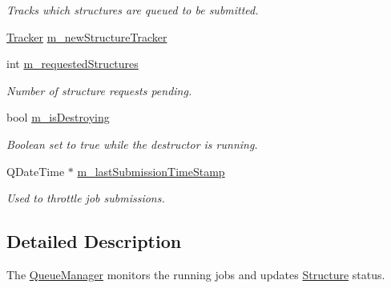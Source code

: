 \begin{DoxyCompactItemize}
\begin{DoxyCompactList}\small\item\em Tracks which structures are queued to be submitted. \end{DoxyCompactList}\item 
\hyperlink{classGlobalSearch_1_1Tracker}{Tracker} \hyperlink{classGlobalSearch_1_1QueueManager_ab93522c4a198ea3401baf662b00a7ec7}{m\+\_\+new\+Structure\+Tracker}
\item 
\hypertarget{classGlobalSearch_1_1QueueManager_ae8f5365d11d9db4bb8607a909b843cce}{}int \hyperlink{classGlobalSearch_1_1QueueManager_ae8f5365d11d9db4bb8607a909b843cce}{m\+\_\+requested\+Structures}\label{classGlobalSearch_1_1QueueManager_ae8f5365d11d9db4bb8607a909b843cce}

\begin{DoxyCompactList}\small\item\em Number of structure requests pending. \end{DoxyCompactList}\item 
\hypertarget{classGlobalSearch_1_1QueueManager_a33201e78793ede9a0b2bc233e180664c}{}bool \hyperlink{classGlobalSearch_1_1QueueManager_a33201e78793ede9a0b2bc233e180664c}{m\+\_\+is\+Destroying}\label{classGlobalSearch_1_1QueueManager_a33201e78793ede9a0b2bc233e180664c}

\begin{DoxyCompactList}\small\item\em Boolean set to true while the destructor is running. \end{DoxyCompactList}\item 
\hypertarget{classGlobalSearch_1_1QueueManager_a94ba4286ec00cec9516ef9766e4d76a1}{}Q\+Date\+Time $\ast$ \hyperlink{classGlobalSearch_1_1QueueManager_a94ba4286ec00cec9516ef9766e4d76a1}{m\+\_\+last\+Submission\+Time\+Stamp}\label{classGlobalSearch_1_1QueueManager_a94ba4286ec00cec9516ef9766e4d76a1}

\begin{DoxyCompactList}\small\item\em Used to throttle job submissions. \end{DoxyCompactList}\end{DoxyCompactItemize}


\subsection{Detailed Description}
The \hyperlink{classGlobalSearch_1_1QueueManager}{Queue\+Manager} monitors the running jobs and updates \hyperlink{classGlobalSearch_1_1Structure}{Structure} status. 

